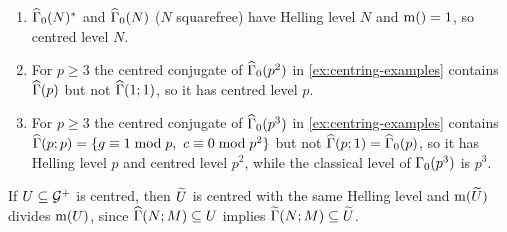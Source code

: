 \begin{example}\label{ex:centred-levels}
\begin{enumerate}
\item $\GammaZeroStar[ad]{N}$ and $\GammaZero[ad]{N}$ ($N$ squarefree) have
  Helling level $N$ and $\operatorname{m}() = 1$, so centred level $N$.
\item For $p \geq 3$ the centred conjugate of $\GammaZero[ad]{p^{2}}$ in
  \cref{ex:centring-examples} contains $\GammaFull[ad]{p}$ but not
  $\GammaPrincipal[ad]{1}{1}$, so it has centred level $p$.
\item For $p \geq 3$ the centred conjugate of $\GammaZero[ad]{p^{3}}$ in
  \cref{ex:centring-examples} contains $\GammaPrincipal[ad]{p}{p} =
  \{g \equiv 1 \bmod p,\ c \equiv 0 \bmod p^{2}\}$ but not
  $\GammaPrincipal[ad]{p}{1} = \GammaZero[ad]{p}$, so it has Helling level
  $p$ and centred level $p^{2}$, while the classical level of
  $\GammaZero{p^{3}}$ is $p^{3}$.
\end{enumerate}
\end{example}

\begin{remark}
If $U \subseteq \mathcal{G}^{+}$ is centred, then $\widetilde{U}$ is centred with
the same Helling level and $\operatorname{m}(\widetilde{U})$ divides
$\operatorname{m}(U)$, since $\GammaPrincipal[ad]{N}{M} \subseteq U$
implies $\GammaPrincipal[lift]{N}{M} \subseteq \lifted{U}$.
\end{remark}
